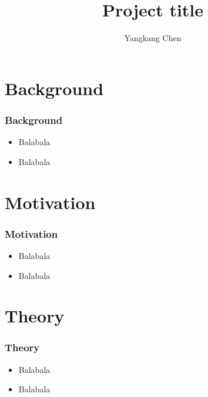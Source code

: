\documentclass[]{beamer}
\begin{document}
\title[projname]{Project title}
\author[Y. Chen]{Yangkang Chen}
\newcommand{\centered}[1]{\begin{center} #1 \end{center}}



\begin{frame}
  \titlepage
\end{frame}

\section{Background}
\begin{frame}\frametitle{Background}
\begin{center}
\begin{itemize}
\item Balabala
\item Balabala
\end{itemize}
\end{center}
\end{frame}

\section{Motivation}
\begin{frame}\frametitle{Motivation}
\begin{center}
\begin{itemize}
\item Balabala
\item Balabala
\end{itemize}
\end{center}
\end{frame}


\section{Theory}
\begin{frame}\frametitle{Theory}
\begin{itemize}
\item Balabala
\item Balabala
\end{itemize}
\end{frame}
\end{document}
